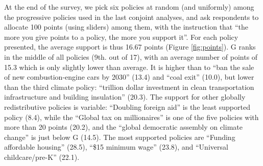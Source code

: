\documentclass{nature}
\makeatletter
\renewenvironment*{figure}{\@float{figure}}{\end@float}
\makeatother
\begin{document}
\begin{figure}

  \caption{Conjoint analysis (asked only to non-Republicans). Average Marginal Component Effects (relative to the baseline: an absence of policy of that category) of policies in the choice of candidate for a hypothetical duel in the 2024 Democratic primary, where both platforms are randomly drawn ($n$ = 2,000).}\label{fig:ca_r}
\end{figure}

At the end of the survey, we pick six policies at random (and uniformly) among the progressive policies used in the last conjoint analyses, and ask respondents to allocate 100 points (using sliders) among them, with the instruction that ``the more you give points to a policy, the more you support it''. For each policy presented, the average support is thus 16.67 points (Figure \ref{fig:points}). G ranks in the middle of all policies (9th. out of 17), with an average number of points of 15.3 which is only slightly lower than average. It is higher than to ``ban the sale of new combustion-engine cars by 2030'' (13.4) and ``coal exit'' (10.0), but lower than the third climate policy: ``trillion dollar investment in clean transportation infrastructure and building insulation'' (20.3). The support for other globally redistributive policies is variable: ``Doubling foreign aid'' is the least supported policy (8.4), while the ``Global tax on millionaires'' is one of the five policies with more than 20 points (20.2), and the ``global democratic assembly on climate change'' is just below G (14.5). The most supported policies are ``Funding affordable housing'' (28.5), ``\$15 minimum wage'' (23.8), and ``Universal childcare/pre-K'' (22.1).
\end{document}
